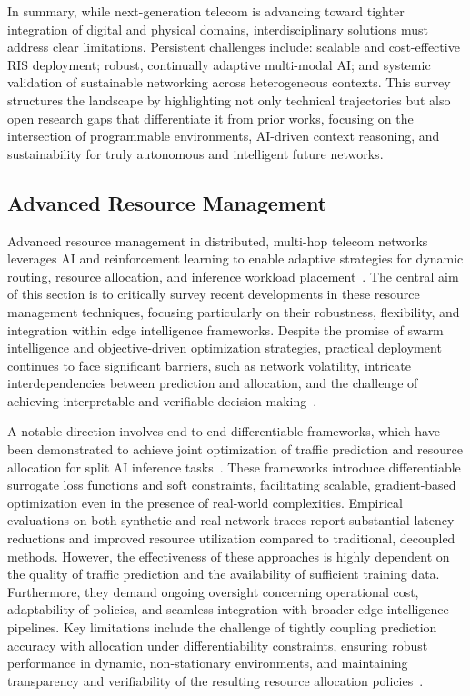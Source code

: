 \documentclass[sigconf]{acmart}
\begin{document}
In summary, while next-generation telecom is advancing toward tighter integration of digital and physical domains, interdisciplinary solutions must address clear limitations. Persistent challenges include: scalable and cost-effective RIS deployment; robust, continually adaptive multi-modal AI; and systemic validation of sustainable networking across heterogeneous contexts. This survey structures the landscape by highlighting not only technical trajectories but also open research gaps that differentiate it from prior works, focusing on the intersection of programmable environments, AI-driven context reasoning, and sustainability for truly autonomous and intelligent future networks.

\subsection{Advanced Resource Management}

Advanced resource management in distributed, multi-hop telecom networks leverages AI and reinforcement learning to enable adaptive strategies for dynamic routing, resource allocation, and inference workload placement~\cite{ref48}. The central aim of this section is to critically survey recent developments in these resource management techniques, focusing particularly on their robustness, flexibility, and integration within edge intelligence frameworks. Despite the promise of swarm intelligence and objective-driven optimization strategies, practical deployment continues to face significant barriers, such as network volatility, intricate interdependencies between prediction and allocation, and the challenge of achieving interpretable and verifiable decision-making~\cite{ref48}.

A notable direction involves end-to-end differentiable frameworks, which have been demonstrated to achieve joint optimization of traffic prediction and resource allocation for split AI inference tasks~\cite{ref48}. These frameworks introduce differentiable surrogate loss functions and soft constraints, facilitating scalable, gradient-based optimization even in the presence of real-world complexities. Empirical evaluations on both synthetic and real network traces report substantial latency reductions and improved resource utilization compared to traditional, decoupled methods. However, the effectiveness of these approaches is highly dependent on the quality of traffic prediction and the availability of sufficient training data. Furthermore, they demand ongoing oversight concerning operational cost, adaptability of policies, and seamless integration with broader edge intelligence pipelines. Key limitations include the challenge of tightly coupling prediction accuracy with allocation under differentiability constraints, ensuring robust performance in dynamic, non-stationary environments, and maintaining transparency and verifiability of the resulting resource allocation policies~\cite{ref48}.
\end{document}
